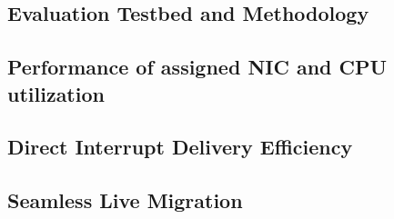 \subsection{Evaluation Testbed and Methodology}


\subsection{Performance of assigned NIC and CPU utilization}


\subsection{Direct Interrupt Delivery Efficiency}


\subsection{Seamless Live Migration}

